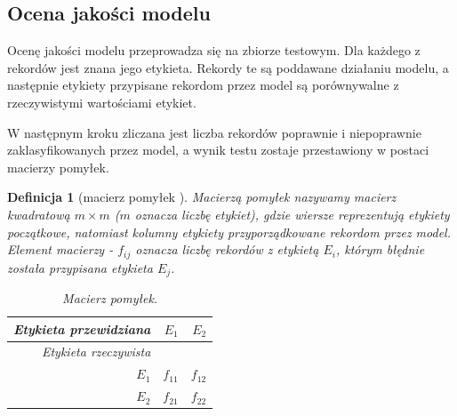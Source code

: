 \documentclass[12pt,a4paper]{report}
\newtheorem{df}{Definicja}[chapter]
\begin{document}
\subsection{Ocena jakości modelu}
Ocenę jakości modelu przeprowadza się na zbiorze testowym. Dla każdego z rekordów jest znana jego etykieta. Rekordy te są poddawane działaniu modelu, a następnie etykiety przypisane rekordom przez model są porównywalne z rzeczywistymi wartościami etykiet.

W następnym kroku zliczana jest liczba rekordów poprawnie i niepoprawnie zaklasyfikowanych przez model, a wynik testu zostaje przestawiony w postaci macierzy pomyłek.
\begin{df}[macierz pomyłek {\citep[Sec 4.8.1]{edmia}}]
Macierzą pomyłek nazywamy macierz kwadratową $ m \times m$ ($m$ oznacza liczbę etykiet), gdzie wiersze reprezentują etykiety początkowe, natomiast kolumny etykiety przyporządkowane rekordom przez model. Element macierzy - $f_{ij}$ oznacza liczbę rekordów z etykietą $E_i$, którym błędnie została przypisana etykieta $E_j$.
\begin{table}[H]
\begin{center}
\begin{tabular}{|r|r|r|} \hline
Etykieta przewidziana & $E_1$ & $E_2$\\
\hline
Etykieta rzeczywista & &  \\
\hline 
$E_1$ & $f_{11}$ & $f_{12}$ \\
\hline
$E_2$ & $f_{21}$ & $f_{22}$  \\
\hline
\end{tabular}
\end{center}
\caption{Macierz pomyłek.}
\label{tabelka}
\end{table}
\end{df}
\end{document}
